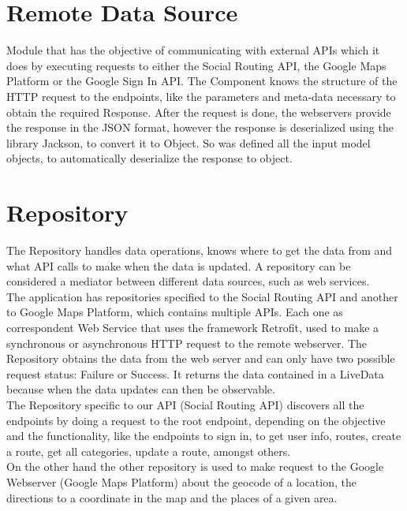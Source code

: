 \section{Remote Data Source}
Module that has the objective of communicating with external APIs which it does by executing requests to either the Social Routing API, the Google Maps Platform or the Google Sign In API. 
The Component knows the structure of the HTTP request to the endpoints, like the parameters and meta-data necessary to obtain the required Response. After the request is done, the webservers\cite{webserver} 
provide the response in the JSON\cite{jsonwebsite} format, however the response is deserialized using the library Jackson\cite{jackson}, to convert it to Object. 
So was defined all the input model objects, to automatically deserialize the response to object.\\

\section{Repository}
The Repository handles data operations, knows where to get the data from
and what API calls to make when the data is updated. A repository can be
considered a mediator between different data sources, such as web services. \\
The application has repositories specified to the Social Routing API and another to Google Maps Platform, which contains
multiple APIs. Each one as correspondent Web Service that uses the
framework Retrofit\cite{retrofit}, used to make a synchronous or asynchronous HTTP request to the remote webserver. The Repository obtains the data
from the web server and can only have two possible request status: Failure or Success. It returns the data contained in a LiveData\cite{livedata} because when the data 
updates can then be observable. \\
The Repository specific to our API (Social Routing API) discovers all the endpoints by doing a request to the root endpoint, 
depending on the objective and the functionality, like the endpoints to sign in, to get user info, routes, create a route, get all categories, update a route, amongst others. \\
On the other hand the other repository is used to make request to the Google Webserver (Google Maps Platform) about the geocode\cite{geocode} of a location, the directions to a 
coordinate in the map and the places of a given area. 

